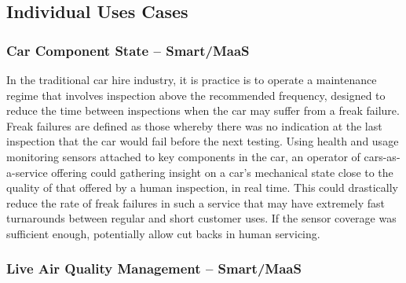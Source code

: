\documentclass[journal]{IEEEtran}
\begin{document}


\subsection{Individual Uses Cases}

\subsubsection{Car Component State -- Smart/MaaS}

In the traditional car hire industry, it is practice is to operate a
maintenance regime that involves inspection above the recommended
frequency, designed to reduce the time between inspections when the
car may suffer from a freak failure. Freak failures are defined as
those whereby there was no indication at the last inspection that the
car would fail before the next testing. Using health and usage
monitoring sensors attached to key components in the car, an operator
of cars-as-a-service offering could gathering insight on a car's
mechanical state close to the quality of that offered by a human
inspection, in real time. This could drastically reduce the rate of
freak failures in such a service that may have extremely fast
turnarounds between regular and short customer uses. If the sensor
coverage was sufficient enough, potentially allow cut backs in human
servicing.

\subsubsection{Live Air Quality Management -- Smart/MaaS}
\end{document}

